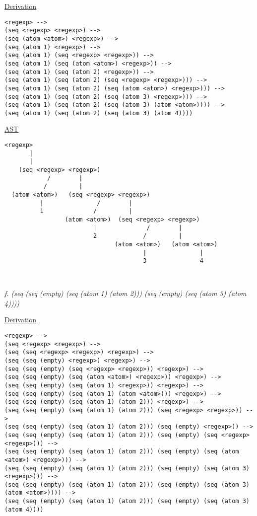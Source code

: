 \documentclass{article}
\begin{document}
\underline{Derivation}
\begin{lstlisting}[language=vasu]
<regexp> --> 
(seq <regexp> <regexp>) -->
(seq (atom <atom>) <regexp>) -->
(seq (atom 1) <regexp>) -->
(seq (atom 1) (seq <regexp> <regexp>)) -->
(seq (atom 1) (seq (atom <atom>) <regexp>)) -->
(seq (atom 1) (seq (atom 2) <regexp>)) -->
(seq (atom 1) (seq (atom 2) (seq <regexp> <regexp>))) -->
(seq (atom 1) (seq (atom 2) (seq (atom <atom>) <regexp>))) -->
(seq (atom 1) (seq (atom 2) (seq (atom 3) <regexp>))) -->
(seq (atom 1) (seq (atom 2) (seq (atom 3) (atom <atom>)))) -->
(seq (atom 1) (seq (atom 2) (seq (atom 3) (atom 4))))

\end{lstlisting}

\underline{AST}
\begin{lstlisting}[language=vasu]
    <regexp>
       |
       |
    (seq <regexp> <regexp>)
            /        |
           /         |
  (atom <atom>)   (seq <regexp> <regexp>)
          |               /        |
          1              /         |
                 (atom <atom>)  (seq <regexp> <regexp>)
                         |              /        |
                         2             /         |
                               (atom <atom>)   (atom <atom>)
                                       |               |
                                       3               4           
      
      
\end{lstlisting}
\newpage

\begin{quoting}
\textit{f. (seq (seq (empty) (seq (atom 1) (atom 2))) (seq (empty) (seq (atom 3) (atom 4))))}
\end{quoting}

\underline{Derivation}
\begin{lstlisting}[language=vasu]
<regexp> --> 
(seq <regexp> <regexp>) -->
(seq (seq <regexp> <regexp>) <regexp>) -->
(seq (seq (empty) <regexp>) <regexp>) -->
(seq (seq (empty) (seq <regexp> <regexp>)) <regexp>) -->
(seq (seq (empty) (seq (atom <atom>) <regexp>)) <regexp>) -->
(seq (seq (empty) (seq (atom 1) <regexp>)) <regexp>) -->
(seq (seq (empty) (seq (atom 1) (atom <atom>))) <regexp>) -->
(seq (seq (empty) (seq (atom 1) (atom 2))) <regexp>) -->
(seq (seq (empty) (seq (atom 1) (atom 2))) (seq <regexp> <regexp>)) -->
(seq (seq (empty) (seq (atom 1) (atom 2))) (seq (empty) <regexp>)) -->
(seq (seq (empty) (seq (atom 1) (atom 2))) (seq (empty) (seq <regexp> <regexp>))) -->
(seq (seq (empty) (seq (atom 1) (atom 2))) (seq (empty) (seq (atom <atom>) <regexp>))) -->
(seq (seq (empty) (seq (atom 1) (atom 2))) (seq (empty) (seq (atom 3) <regexp>))) -->
(seq (seq (empty) (seq (atom 1) (atom 2))) (seq (empty) (seq (atom 3) (atom <atom>)))) -->
(seq (seq (empty) (seq (atom 1) (atom 2))) (seq (empty) (seq (atom 3) (atom 4))))

\end{lstlisting}
\end{document}
